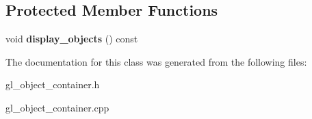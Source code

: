 \subsection*{Protected Member Functions}
\begin{DoxyCompactItemize}
\item 
\hypertarget{class_g_l__object__container_add86f2b25acda2b1b9d9bf24f4b12dd0}{
void {\bfseries display\_\-objects} () const }
\label{class_g_l__object__container_add86f2b25acda2b1b9d9bf24f4b12dd0}

\end{DoxyCompactItemize}


The documentation for this class was generated from the following files:\begin{DoxyCompactItemize}
\item 
gl\_\-object\_\-container.h\item 
gl\_\-object\_\-container.cpp\end{DoxyCompactItemize}

